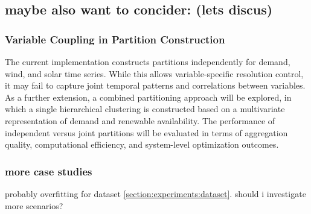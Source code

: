 \subsection{maybe also want to concider: (lets discus)}
\subsubsection{Variable Coupling in Partition Construction}

The current implementation constructs partitions independently for demand, wind, and solar time series. While this allows variable-specific resolution control, it may fail to capture joint temporal patterns and correlations between variables. As a further extension, a combined partitioning approach will be explored, in which a single hierarchical clustering is constructed based on a multivariate representation of demand and renewable availability. The performance of independent versus joint partitions will be evaluated in terms of aggregation quality, computational efficiency, and system-level optimization outcomes.


\subsubsection{more case studies}
probably overfitting for dataset \ref{section:experiments:dataset}. should i investigate more scenarios?
